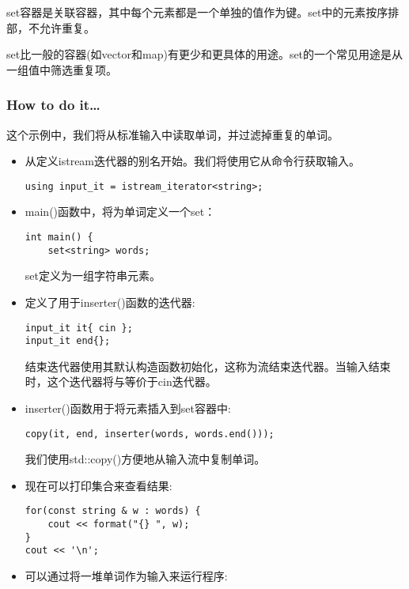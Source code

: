 
set容器是关联容器，其中每个元素都是一个单独的值作为键。set中的元素按序排部，不允许重复。

set比一般的容器(如vector和map)有更少和更具体的用途。set的一个常见用途是从一组值中筛选重复项。

\subsubsection{How to do it…}

这个示例中，我们将从标准输入中读取单词，并过滤掉重复的单词。

\begin{itemize}
\item 
从定义istream迭代器的别名开始。我们将使用它从命令行获取输入。

\begin{lstlisting}[style=styleCXX]
using input_it = istream_iterator<string>;
\end{lstlisting}

\item 
main()函数中，将为单词定义一个set：

\begin{lstlisting}[style=styleCXX]
int main() {
	set<string> words;
\end{lstlisting}

set定义为一组字符串元素。

\item 
定义了用于inserter()函数的迭代器:

\begin{lstlisting}[style=styleCXX]
input_it it{ cin };
input_it end{};
\end{lstlisting}

结束迭代器使用其默认构造函数初始化，这称为流结束迭代器。当输入结束时，这个迭代器将与等价于cin迭代器。

\item 
inserter()函数用于将元素插入到set容器中:

\begin{lstlisting}[style=styleCXX]
copy(it, end, inserter(words, words.end()));
\end{lstlisting}

我们使用std::copy()方便地从输入流中复制单词。

\item 
现在可以打印集合来查看结果:

\begin{lstlisting}[style=styleCXX]
for(const string & w : words) {
	cout << format("{} ", w);
}
cout << '\n';
\end{lstlisting}

\item 
可以通过将一堆单词作为输入来运行程序:

\end{itemize}

